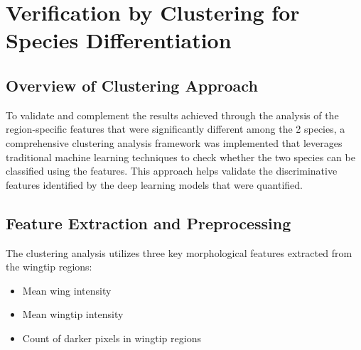 \documentclass[a4paper,12pt]{report}
\begin{document}
    

\section{Verification by Clustering for Species Differentiation}

\subsection{Overview of Clustering Approach}

To validate and complement the results achieved through the analysis of the region-specific features that were significantly different among the 2 species, a comprehensive clustering analysis framework was implemented that leverages traditional machine learning techniques to check whether the two species can be classified using the features. This approach helps validate the discriminative features identified by the deep learning models that were quantified.

\subsection{Feature Extraction and Preprocessing}

The clustering analysis utilizes three key morphological features extracted from the wingtip regions:
\begin{itemize}
    \item Mean wing intensity
    \item Mean wingtip intensity
    \item Count of darker pixels in wingtip regions
\end{itemize}
\end{document}

